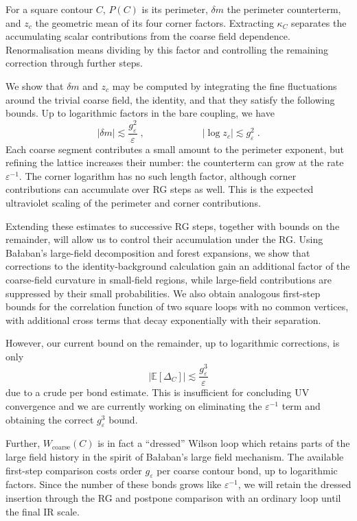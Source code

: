 \documentclass[12pt]{article}
\begin{document}
For a square contour $C$, $P(C)$ is its perimeter, $\delta m$ the perimeter counterterm, and $z_c$ the geometric mean of its four corner factors. Extracting $\kappa_C$ separates the accumulating scalar contributions from the coarse field dependence. Renormalisation means dividing by this factor and controlling the remaining correction through further steps.

We show that $\delta m$ and $z_c$ may be computed by integrating the fine fluctuations around the trivial coarse field, the identity, and that they satisfy the following bounds. Up to logarithmic factors in the bare coupling, we have
\begin{equation*}
    |\delta m|\lesssim  \frac{g_\varepsilon^2}{\varepsilon}\;,\qquad\qquad\qquad |\log z_c| \lesssim g_\varepsilon^2\;.
\end{equation*}
Each coarse segment contributes a small amount to the perimeter exponent, but refining the lattice increases their number: the counterterm can grow at the rate $\varepsilon^{-1}$. The corner logarithm has no such length factor, although corner contributions can accumulate over RG steps as well. This is the expected ultraviolet scaling of the perimeter and corner contributions.


Extending these estimates to successive RG steps, together with bounds on the remainder, will allow us to control their accumulation under the RG. Using Ba{\l}aban's large-field decomposition and forest expansions, we show that corrections to the identity-background calculation gain an additional factor of the coarse-field curvature in small-field regions, while large-field contributions are suppressed by their small probabilities. We also obtain analogous first-step bounds for the correlation function of two square loops with no common vertices, with additional cross terms that decay exponentially with their separation.


However, our current bound on the remainder, up to logarithmic corrections, is only
\begin{equation*}
    \left|\mathbb E[\Delta_C]\right| \lesssim \frac{g_\varepsilon^3}{\varepsilon}    
\end{equation*}
due to a crude per bond estimate. This is insufficient for concluding UV convergence and we are currently working on eliminating the $\varepsilon^{-1}$ term and obtaining the correct $g_\varepsilon^3$ bound.

Further, $W_{\mathrm{coarse}}(C)$ is in fact a ``dressed'' Wilson loop which retains parts of the large field history in the spirit of Ba{\l}aban's large field mechanism. The available first-step comparison costs order $g_\varepsilon$ per coarse contour bond, up to logarithmic factors. Since the number of these bonds grows like $\varepsilon^{-1}$, we will retain the dressed insertion through the RG and postpone comparison with an ordinary loop until the final IR scale.
\end{document}
